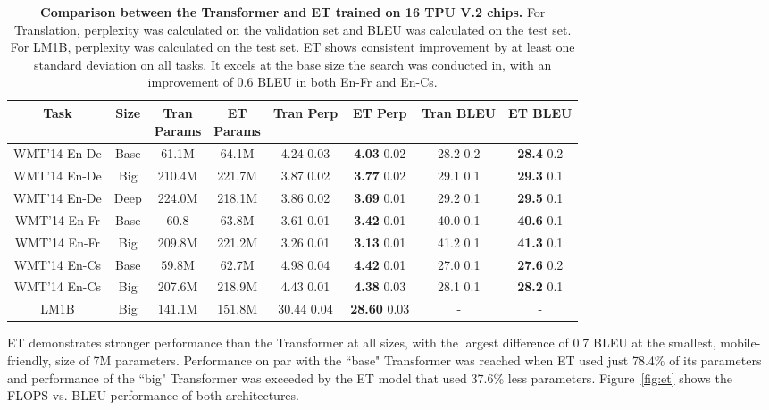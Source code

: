 \documentclass{article}
\begin{document}
\begin{table*}[h!]
\begin{center}
\begin{small}
\begin{sc}
\begin{tabular}{cccc@{\hskip 0.4in}cc@{\hskip 0.4in}cc}
\toprule
Task & Size & \thead{Tran \\ Params} & \thead{ET \\ Params} & Tran Perp  & ET Perp & Tran BLEU & ET BLEU \\
\midrule
WMT'14 En-De  & Base & 61.1M & 64.1M & 4.24  0.03 & \textbf{4.03}  0.02 & 28.2  0.2 & \textbf{28.4}  0.2 \\
WMT'14 En-De    & Big & 210.4M & 221.7M & 3.87  0.02 & \textbf{3.77}  0.02 & 29.1  0.1 & \textbf{29.3}  0.1 \\
WMT'14 En-De    & Deep & 224.0M & 218.1M & 3.86  0.02 & \textbf{3.69}  0.01 & 29.2  0.1 & \textbf{29.5}  0.1 \\
\midrule
WMT'14 En-Fr    & Base & 60.8 & 63.8M & 3.61  0.01 & \textbf{3.42}  0.01 & 40.0  0.1 & \textbf{40.6}  0.1 \\
WMT'14 En-Fr    & Big & 209.8M & 221.2M & 3.26  0.01 & \textbf{3.13}  0.01 & 41.2  0.1 & \textbf{41.3}  0.1 \\
\midrule
WMT'14 En-Cs    & Base & 59.8M & 62.7M & 4.98  0.04 & \textbf{4.42}  0.01 & 27.0  0.1 & \textbf{27.6}  0.2 \\
WMT'14 En-Cs    & Big & 207.6M & 218.9M & 4.43  0.01 & \textbf{4.38}  0.03 & 28.1  0.1 & \textbf{28.2}  0.1 \\ 
\midrule
LM1B            & Big & 141.1M & 151.8M & 30.44  0.04 & \textbf{28.60}  0.03 & - & - \\ 
\bottomrule
\end{tabular}
\end{sc}
\end{small}
\end{center}
\caption{\textbf{Comparison between the Transformer and ET trained on 16 TPU V.2 chips.} For Translation, perplexity was calculated on the validation set and BLEU was calculated on the test set. For LM1B, perplexity was calculated on the test set. ET shows consistent improvement by at least one standard deviation on all tasks. It excels at the base size the search was conducted in, with an improvement of 0.6 BLEU in both En-Fr and En-Cs.}
\vskip -0.1in
\label{table:all_tasks}
\end{table*}

ET demonstrates stronger performance than the Transformer at all sizes, with the largest difference of 0.7 BLEU at the smallest, mobile-friendly, size of 7M parameters. Performance on par with the ``base" Transformer was reached when ET used just 78.4\% of its parameters and performance of the ``big" Transformer was exceeded by the ET model that used  37.6\% less parameters. Figure~\ref{fig:et} shows the FLOPS vs. BLEU performance of both architectures. 
\end{document}
